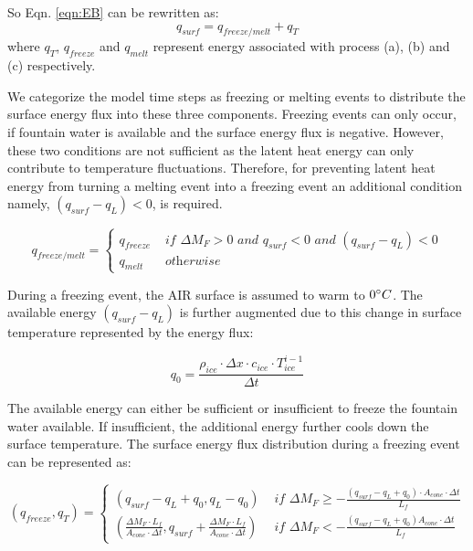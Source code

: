 \documentclass[utf8]{frontiersSCNS}
\begin{document}
So Eqn. \ref{eqn:EB} can be rewritten as: \begin{equation} q_{surf} = q_{freeze/melt} + q_{T} \end{equation}
where $q_{T}$, $q_{freeze}$ and $q_{melt}$ represent energy associated with process (a), (b) and (c)
respectively.

We categorize the model time steps as freezing or melting events to distribute the surface energy flux into
these three components. Freezing events can only occur, if fountain water is available and the surface energy
flux is negative. However, these two conditions are not sufficient as the latent heat energy can only contribute
to temperature fluctuations. Therefore, for preventing latent heat energy from turning a melting event into a
freezing event an additional condition namely, $(q_{surf}-q_{L}) < 0$, is required.

\begin{equation}
	q_{freeze/melt} = \left\{ \begin{array}{ll}
		q_{freeze} & \textit{ if } \Delta M_{F} > 0 \textit{ and } q_{surf} < 0 \textit{ and }(q_{surf}-q_{L}) < 0 \\
		q_{melt}   & \textit{ otherwise}
	\end{array} \right.
\end{equation}

During a freezing event, the AIR surface is assumed to warm to $0 \degree C$. The available energy
$(q_{surf}-q_{L})$ is further augmented due to this change in surface temperature represented by the energy
flux:

$$q_{0} = \frac{\rho_{ice} \cdot \Delta x \cdot c_{ice} \cdot T_{ice}^{i-1}}{\Delta t}$$

The available energy can either be sufficient or insufficient to freeze the fountain water available. If
insufficient, the additional energy further cools down the surface temperature. The surface energy flux
distribution during a freezing event can be represented as:

\begin{equation}
	(q_{freeze}, q_{T}) = \left\{ \begin{array}{ll}
		(q_{surf}-q_{L}+q_{0}, q_{L}-q_{0}) & \textit{ if } \Delta M_{F} \geq -\frac{(q_{surf}-q_{L}+q_{0}) \cdot A_{cone} \cdot \Delta
		t}{L_f}                                                                                                                         \\
		(\frac{\Delta M_{F} \cdot L_f
		}{A_{cone} \cdot \Delta t}
		, q_{surf}+\frac{\Delta M_{F} \cdot L_f
		}{A_{cone} \cdot \Delta t})         & \textit{ if } \Delta M_{F} < -\frac{(q_{surf}-q_{L}+q_0) A_{cone} \cdot \Delta
		t}{L_f}
	\end{array} \right.
\end{equation}
\end{document}
